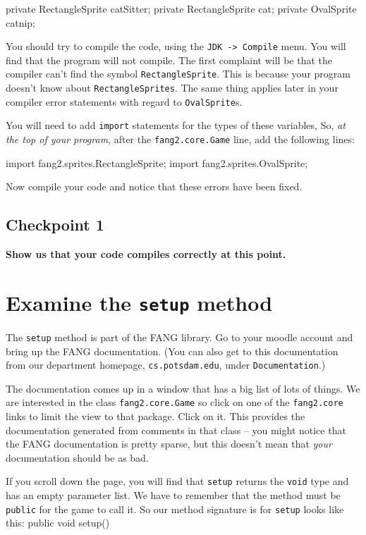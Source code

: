 \documentclass[12pt]{article}
\newcommand{\fname}[1]{\texttt{#1}}
\newcommand{\code}[1]{\texttt{#1}}
\newenvironment{qv}%
  {\quote
   \verbatim}%
  {\endverbatim
   \endquote}
\begin{document}
\begin{qv}
private RectangleSprite catSitter;
private RectangleSprite cat;
private OvalSprite catnip;
\end{qv}

You should try to compile the code, using the
\fname{JDK -> Compile} menu.
You will find that the program will not compile.
The first complaint will be that
the compiler can't find the symbol
\code{RectangleSprite}.
This is because your program doesn't know about \code{RectangleSprites}.
The same thing applies later in your compiler error statements
with regard to \code{OvalSprite}s.

You will need to add \code{import} statements
for the types of these variables,
So, \emph{at the top of your program},
after the \code{fang2.core.Game} line, add the following lines:

\begin{qv}
import fang2.sprites.RectangleSprite;
import fang2.sprites.OvalSprite;
\end{qv}

Now compile your code
and notice that these errors have been fixed.

\subsection*{Checkpoint 1}
{\bf Show us that your code compiles correctly at this point.}

\section{Examine the \code{setup} method}

The \code{setup} method is part of the FANG library.
Go to your moodle account and bring up the FANG documentation.
(You can also get to this documentation from
our department homepage, \fname{cs.potsdam.edu},
under \fname{Documentation}.)

The documentation comes up in a window that has a big list of lots of
things. We are interested in the class \fname{fang2.core.Game} so click
on one of the \fname{fang2.core} links to limit the view to that
package.
Click on it. This provides the documentation generated from
comments in that class
-- you might notice that the FANG documentation is pretty sparse,
but this doesn't mean that {\em your} documentation should be as bad.

If you scroll down the page, you will find that \code{setup} returns the
\code{void} type and has an empty parameter list. We have to remember
that the method must be \code{public} for the game to call it. So our
method signature is for \code{setup} looks like this:
\begin{qv}
public void setup() 
\end{qv}
\end{document}
